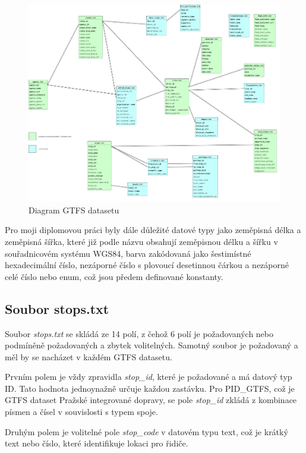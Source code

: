 \begin{figure}[H] \centering
    \includegraphics[width=400pt]{./pictures/GTFS-diagram.PNG}
    \caption[Diagram GTFS datasetu]{Diagram GTFS datasetu}
	\label{fig:GTFS-diagram}              
\end{figure}

Pro moji diplomovou práci byly dále důležité datové typy jako zeměpisná délka a zeměpisná šířka,
které již podle názvu obsahují zeměpisnou délku a šířku v souřadnicovém systému WGS84, barva zakódovaná 
jako šestimístné hexadecimální číslo, nezáporné číslo s plovoucí desetinnou čárkou a nezáporné celé číslo
nebo enum, což jsou předem definované konstanty.

\subsection{Soubor stops.txt}
Soubor \textit{stops.txt} se skládá ze 14 polí, z čehož 6 polí je požadovaných nebo podmíněně požadovaných 
a zbytek volitelných. Samotný soubor je požadovaný a měl by se nacházet v každém GTFS datasetu.

Prvním polem je vždy zpravidla \textit{stop\_id}, které je požadované a má datový typ ID.
Tato hodnota jednoynažně určuje každou zastávku. Pro PID\_GTFS, což je GTFS dataset Pražské integrované dopravy,
se pole \textit{stop\_id} zkládá z kombinace písmen a čísel v souvislosti s typem spoje.

Druhým polem je volitelné pole \textit{stop\_code} v datovém typu text, což je krátký text nebo číslo, 
které identifikuje lokaci pro řidiče. 

